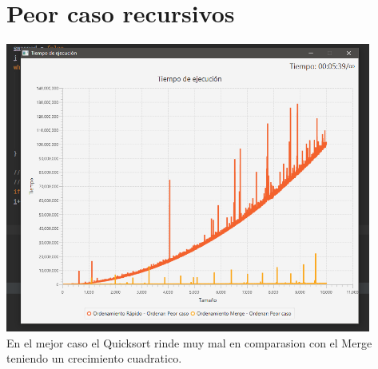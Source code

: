 \documentclass{article}
\begin{document}
\section{Peor caso recursivos}
\includegraphics[width=12cm]{peor_r.png}\\
En el mejor caso el Quicksort rinde muy mal en comparasion con el Merge teniendo un crecimiento cuadratico.
\end{document}
